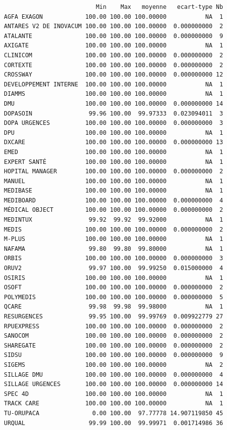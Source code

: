 \documentclass[]{article}
\begin{document}
\begin{verbatim}
                          Min    Max   moyenne   ecart-type Nb
AGFA EXAGON            100.00 100.00 100.00000           NA  1
ANTARES V2 DE INOVACUM 100.00 100.00 100.00000  0.000000000  2
ATALANTE               100.00 100.00 100.00000  0.000000000  9
AXIGATE                100.00 100.00 100.00000           NA  1
CLINICOM               100.00 100.00 100.00000  0.000000000  2
CORTEXTE               100.00 100.00 100.00000  0.000000000  2
CROSSWAY               100.00 100.00 100.00000  0.000000000 12
DEVELOPPEMENT INTERNE  100.00 100.00 100.00000           NA  1
DIAMMS                 100.00 100.00 100.00000           NA  1
DMU                    100.00 100.00 100.00000  0.000000000 14
DOPASOIN                99.96 100.00  99.97333  0.023094011  3
DOPA URGENCES          100.00 100.00 100.00000  0.000000000  3
DPU                    100.00 100.00 100.00000           NA  1
DXCARE                 100.00 100.00 100.00000  0.000000000 13
EMED                   100.00 100.00 100.00000           NA  1
EXPERT SANTÉ           100.00 100.00 100.00000           NA  1
HOPITAL MANAGER        100.00 100.00 100.00000  0.000000000  2
MANUEL                 100.00 100.00 100.00000           NA  1
MEDIBASE               100.00 100.00 100.00000           NA  1
MEDIBOARD              100.00 100.00 100.00000  0.000000000  4
MÉDICAL OBJECT         100.00 100.00 100.00000  0.000000000  2
MEDINTUX                99.92  99.92  99.92000           NA  1
MEDIS                  100.00 100.00 100.00000  0.000000000  2
M-PLUS                 100.00 100.00 100.00000           NA  1
NAFAMA                  99.80  99.80  99.80000           NA  1
ORBIS                  100.00 100.00 100.00000  0.000000000  3
ORUV2                   99.97 100.00  99.99250  0.015000000  4
OSIRIS                 100.00 100.00 100.00000           NA  1
OSOFT                  100.00 100.00 100.00000  0.000000000  2
POLYMEDIS              100.00 100.00 100.00000  0.000000000  5
QCARE                   99.98  99.98  99.98000           NA  1
RESURGENCES             99.95 100.00  99.99769  0.009922779 27
RPUEXPRESS             100.00 100.00 100.00000  0.000000000  2
SANOCOM                100.00 100.00 100.00000  0.000000000  2
SHAREGATE              100.00 100.00 100.00000  0.000000000  2
SIDSU                  100.00 100.00 100.00000  0.000000000  9
SIGEMS                 100.00 100.00 100.00000           NA  2
SILLAGE DMU            100.00 100.00 100.00000  0.000000000  4
SILLAGE URGENCES       100.00 100.00 100.00000  0.000000000 14
SPEC 4D                100.00 100.00 100.00000           NA  1
TRACK CARE             100.00 100.00 100.00000           NA  1
TU-ORUPACA               0.00 100.00  97.77778 14.907119850 45
URQUAL                  99.99 100.00  99.99971  0.001714986 36
\end{verbatim}
\end{document}
